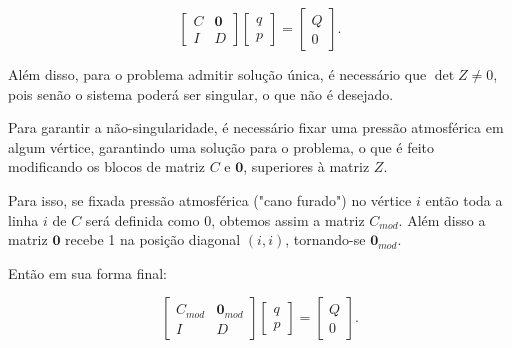 \documentclass{article}
\begin{document}
\[
\begin{bmatrix}
C & \textbf{0} \\
I & D
\end{bmatrix}
\begin{bmatrix}
q \\
p
\end{bmatrix}
=
\begin{bmatrix}
Q \\
0
\end{bmatrix}.
\]

Além disso, para o problema admitir solução única, é necessário que $\det Z \neq 0$, pois senão o sistema poderá ser singular, o que não é desejado. 

Para garantir a não-singularidade, é necessário fixar uma pressão atmosférica em algum vértice, garantindo uma solução para o problema, o que é feito modificando os blocos de matriz $C$ e $\textbf{0}$, superiores à matriz $Z$. 

Para isso, se fixada pressão atmosférica ("cano furado") no vértice $i$ então toda a linha $i$ de $C$ será definida como 0, obtemos assim a matriz $C_{mod}$. Além disso a matriz $\textbf{0}$ recebe 1 na posição diagonal $(i,i)$, tornando-se $\textbf{0}_{mod}$. 

Então em sua forma final:


\[
\begin{bmatrix}
C_{mod} & \textbf{0}_{mod} \\
I & D
\end{bmatrix}
\begin{bmatrix}
q \\
p
\end{bmatrix}
=
\begin{bmatrix}
Q \\
0
\end{bmatrix}.
\]





\end{document}
